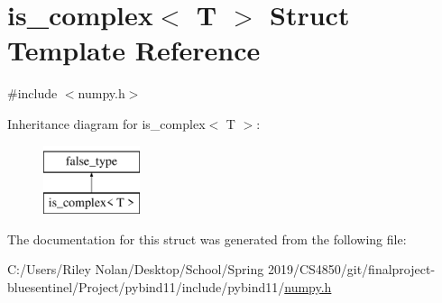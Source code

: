 \hypertarget{structis__complex}{}\section{is\+\_\+complex$<$ T $>$ Struct Template Reference}
\label{structis__complex}


{\ttfamily \#include $<$numpy.\+h$>$}

Inheritance diagram for is\+\_\+complex$<$ T $>$\+:\begin{figure}[H]
\begin{center}
\leavevmode
\includegraphics[height=2.000000cm]{structis__complex}
\end{center}
\end{figure}


The documentation for this struct was generated from the following file\+:\begin{DoxyCompactItemize}
\item 
C\+:/\+Users/\+Riley Nolan/\+Desktop/\+School/\+Spring 2019/\+C\+S4850/git/finalproject-\/bluesentinel/\+Project/pybind11/include/pybind11/\mbox{\hyperlink{numpy_8h}{numpy.\+h}}\end{DoxyCompactItemize}
